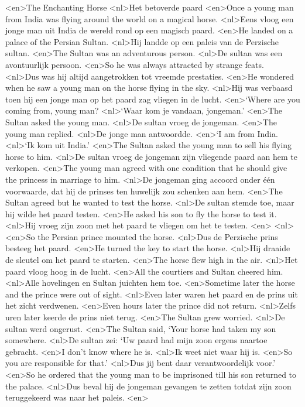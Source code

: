 <en>The Enchanting Horse
<nl>Het betoverde paard
<en>Once a young man from India was flying around the world on a magical horse.
<nl>Eens vloog een jonge man uit India de wereld rond op een magisch paard.
<en>He landed on a palace of the Persian Sultan.
<nl>Hij landde op een paleis van de Perzische sultan.
<en>The Sultan was an adventurous person.
<nl>De sultan was een avontuurlijk persoon.
<en>So he was always attracted by strange feats.
<nl>Dus was hij altijd aangetrokken tot vreemde prestaties.
<en>He wondered when he saw a young man on the horse flying in the sky.
<nl>Hij was verbaasd toen hij een jonge man op het paard zag vliegen in de lucht.
<en>`Where are you coming from, young man?
<nl>`Waar kom je vandaan, jongeman.'
<en>The Sultan asked the young man.
<nl>De sultan vroeg de jongeman.
<en>The young man replied.
<nl>De jonge man antwoordde.
<en>`I am from India.
<nl>`Ik kom uit India.'
<en>The Sultan asked the young man to sell his flying horse to him.
<nl>De sultan vroeg de jongeman zijn vliegende paard aan hem te verkopen.
<en>The young man agreed with one condition that he should give the princess in marriage to him.
<nl>De jongeman ging accoord onder één voorwaarde, dat hij de prinses ten huwelijk zou schenken aan hem.
<en>The Sultan agreed but he wanted to test the horse.
<nl>De sultan stemde toe, maar hij wilde het paard testen.
<en>He asked his son to fly the horse to test it.
<nl>Hij vroeg zijn zoon met het paard te vliegen om het te testen.
<en>
<nl>
<en>So the Persian prince mounted the horse.
<nl>Dus de Perzische prins besteeg het paard.
<en>He turned the key to start the horse.
<nl>Hij draaide de sleutel om het paard te starten.
<en>The horse flew high in the air.
<nl>Het paard vloog hoog in de lucht.
<en>All the courtiers and Sultan cheered him.
<nl>Alle hovelingen en Sultan juichten hem toe.
<en>Sometime later the horse and the prince were out of sight.
<nl>Even later waren het paard en de prins uit het zicht verdwenen.
<en>Even hours later the prince did not return.
<nl>Zelfs uren later keerde de prins niet terug.
<en>The Sultan grew worried.
<nl>De sultan werd ongerust.
<en>The Sultan said, `Your horse had taken my son somewhere.
<nl>De sultan zei: `Uw paard had mijn zoon ergens naartoe gebracht.
<en>I don't know where he is.
<nl>Ik weet niet waar hij is.
<en>So you are responsible for that.'
<nl>Dus jij bent daar verantwoordelijk voor.'
<en>So he ordered that the young man to be imprisoned till his son returned to the palace.
<nl>Dus beval hij de jongeman gevangen te zetten totdat zijn zoon teruggekeerd was naar het paleis.
<en>
